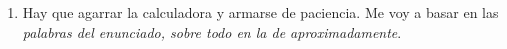 \begin{enumerate}[label=(\alph*)]
$$\begin{array}{rcl}
{            0                                              & \frac{-1}{2} & \frac{1}{2}     & 0                \\
            \frac{-2}{7}                                   & \frac{3}{14} & \frac{3}{14}    & 0
            }                                                                                                  \\
                                                           & =            &
            \matriz{cccc}{
            \frac{3}{7}                                    & \frac{3}{7}  & \frac{3}{7}     & 0                \\
            \frac{2}{7}                                    & \frac{2}{7}  & \frac{2}{7}     & 0                \\
            \frac{2}{7}                                    & \frac{2}{7}  & \frac{2}{7}     & 0                \\
            0                                              & 0            & 0               & 1
            }
            = P_{\magenta{j}}^\infinito
          \end{array}
        $$

  \item Hay que agarrar la calculadora y armarse de paciencia. Me voy a basar en las
        \textit{palabras del enunciado, sobre todo en la de aproximadamente}.


\end{enumerate}
